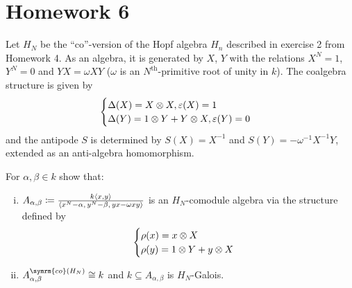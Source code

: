 \section*{Homework 6}

\setcounter{exercise}{0}

\begin{exercise}
Let \(H_N\) be the ``co''-version of the Hopf algebra \(H_n\) described in exercise 2 from Homework 4. As an algebra, it is generated by \(X\), \(Y\) with the relations \(X^N = 1\), \(Y^N = 0\) and \(Y X = \omega X Y\) (\(\omega\) is an \(N^{\text{th}}\)-primitive root of unity in \(k\)). The coalgebra structure is given by
\[
\begin{cases}
    \Delta(X) = X \otimes X, \varepsilon(X) = 1 \\
    \Delta(Y) = 1 \otimes Y + Y \otimes X, \varepsilon(Y) = 0
\end{cases}
\]
and the antipode \(S\) is determined by \(S(X) = X^{-1}\) and \(S(Y) = - \omega^{-1} X^{-1} Y\), extended as an anti-algebra homomorphism.

For \(\alpha, \beta \in k\) show that:
\begin{enumerate}[(i)]
    \item \(A_{\alpha, \beta} \coloneq \frac{k \left\langle x, y\right\rangle}{\left\langle x^N - \alpha, \, y^N - \beta, \, yx - \omega xy\right\rangle}\) is an \(H_N\)-comodule algebra via the structure defined by
    \[
    \begin{cases}
        \rho(x) = x \otimes X\\
        \rho(y) = 1 \otimes Y + y \otimes X
    \end{cases}
    \]

    \item \(A_{\alpha, \beta}^{\symrm{co} \left(H_N\right)} \cong k\) and \(k \subseteq A_{\alpha, \beta}\) is \(H_N\)-Galois.
\end{enumerate}
\end{exercise} 

